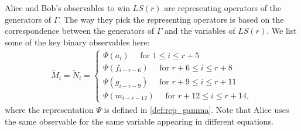 \documentclass[11pt,letterpaper]{article}
\newcommand{\1}{\mathbb{1}}
\newcommand{\LS}{LS}
\newcommand{\tM}{\tilde{M}}
\newcommand{\tN}{\tilde{N}}
\theoremstyle{definition}
\begin{document}
Alice and Bob's observables to win $\LS(r)$ are representing operators of
the generators of $\Gamma$. The way they pick the representing operators
is based on the correspondence between the generators of $\Gamma$ and the
variables of $\LS(r)$. We list some of the key binary observables here:
\begin{align}
	\tM_i = \tN_i = 
	\begin{cases}
	\Psi(a_i) \quad \text{ for } 1 \leq i \leq r+5\\
	\Psi(f_{i-r-6}) \quad \text{ for } r+6 \leq i \leq r+8\\
	\Psi(g_{i-r-9}) \quad \text{ for } r+9 \leq i \leq r+11\\
	\Psi(m_{i-r-12}) \quad \text{ for } r+12 \leq i \leq r+14,
	\end{cases}
\end{align}
where the representation $\Psi$ is defined in \cref{def:rep_gamma}.
Note that Alice uses the same observable for the same variable appearing in different equations.
\end{document}
